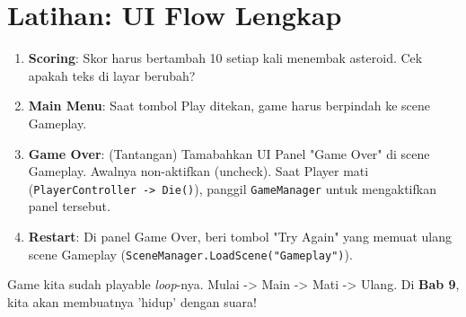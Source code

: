 
\section{Latihan: UI Flow Lengkap}

\begin{enumerate}
    \item \textbf{Scoring}: Skor harus bertambah 10 setiap kali menembak asteroid. Cek apakah teks di layar berubah?
    \item \textbf{Main Menu}: Saat tombol Play ditekan, game harus berpindah ke scene Gameplay.
    \item \textbf{Game Over}: (Tantangan) Tamabahkan UI Panel "Game Over" di scene Gameplay. Awalnya non-aktifkan (uncheck). Saat Player mati (\texttt{PlayerController -> Die()}), panggil \texttt{GameManager} untuk mengaktifkan panel tersebut.
    \item \textbf{Restart}: Di panel Game Over, beri tombol "Try Again" yang memuat ulang scene Gameplay (\texttt{SceneManager.LoadScene("Gameplay")}).
\end{enumerate}

Game kita sudah playable \textit{loop}-nya. Mulai -> Main -> Mati -> Ulang.
Di \textbf{Bab 9}, kita akan membuatnya 'hidup' dengan suara!
